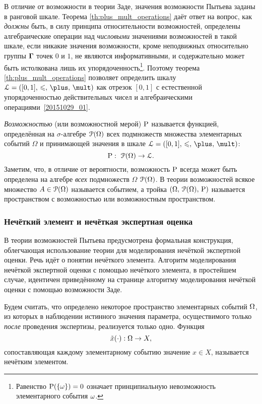 В отличие от возможности в теории Заде, значения возможности Пытьева заданы в ранговой шкале. Теорема \ref{th:plus_mult_operations} даёт ответ на вопрос, как \emph{должны} быть, в силу принципа относительности возможностей, определены алгебраические операции над \emph{числовыми} значениями возможностей в такой шкале, если никакие значения возможности, кроме неподвижных относительно группы $\bTheta$ точек $0$ и $1$, не являются информативными, и содержательно может быть истолкована лишь их упорядоченность\footnote{Равенство $\P(\{\om\}) = 0$ означает принципиальную невозможность элементарного события $\om$.}. Поэтому теорема \ref{th:plus_mult_operations} позволяет определить шкалу $\scL=\scale$ как отрезок $[0,1]$ с естественной упорядоченностью действительных чисел и алгебраическими операциями~\eqref{20151029_01}.

\emph{Возможностью} (или возможностной мерой) $\P$ называется функцией, определённая на $\sigma$-алгебре $\Po(\Omega)$ всех подмножеств множества элементарных событий $\Omega$ и принимающей значения в шкале $\scL=\scale$:
\begin{equation*}
    \P:\ \Po(\Omega)\to\scL.
\end{equation*}
Заметим, что, в отличие от вероятности, возможность $\P$ всегда может быть определена на алгебре \emph{всех} подмножеств $\Omega$ $\Po(\Omega)$. В теории возможностей всякое множество $A\in\Po(\Omega)$ называется событием, а тройка $\OAP$ называется пространством с возможностью или возможностным пространством. 

\subsubsection{Нечёткий элемент и нечёткая экспертная оценка}

В теории возможностей Пытьева предусмотрена формальная конструкция, облегчающая использование теории для моделирования нечёткой экспертной оценки. Речь идёт о понятии нечёткого элемента. Алгоритм моделирования нечёткой экспертной оценки с помощью нечёткого элемента, в простейшем случае, идентичен приведённому на странице \pageref{zadeh_fuzzy_asset_alg} алгоритму моделирования нечёткой оценки с помощью возможности Заде. 

Будем считать, что определено некоторое пространство элементарных событий $\Om$, из которых в наблюдении истинного значения параметра, осуществимого только \emph{после} проведения экспертизы, реализуется только одно. Функция
\begin{equation*}
	\tilde x(\cdot): \Om \rightarrow X,
\end{equation*} 
сопоставляющая каждому элементарному событию значение $x \in X$, называется нечётким элементом.  

